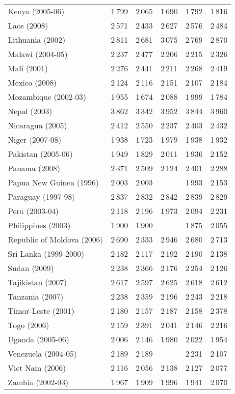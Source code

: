 \begin{tabular}{L{2.0cm} R{0.7cm} R{0.7cm} R{0.7cm} R{0.7cm} R{0.7cm}}
        Kenya (2005-06) & 1\,799 & 2\,065 & 1\,690 & 1\,792 & 1\,816 \\
        Laos (2008) & 2\,571 & 2\,433 & 2\,627 & 2\,576 & 2\,484 \\
        Lithuania (2002) & 2\,811 & 2\,681 & 3\,075 & 2\,769 & 2\,870 \\
        Malawi (2004-05) & 2\,237 & 2\,477 & 2\,206 & 2\,215 & 2\,326 \\
        Mali (2001) & 2\,276 & 2\,441 & 2\,211 & 2\,268 & 2\,419 \\
        Mexico (2008) & 2\,124 & 2\,116 & 2\,151 & 2\,107 & 2\,184 \\
        Mozambique (2002-03) & 1\,955 & 1\,674 & 2\,088 & 1\,999 & 1\,784 \\
        Nepal (2003) & 3\,862 & 3\,342 & 3\,952 & 3\,844 & 3\,960 \\
        Nicaragua (2005) & 2\,412 & 2\,550 & 2\,237 & 2\,403 & 2\,432 \\
        Niger (2007-08) & 1\,938 & 1\,723 & 1\,979 & 1\,938 & 1\,932 \\
        Pakistan (2005-06) & 1\,949 & 1\,829 & 2\,011 & 1\,936 & 2\,152 \\
        Panama (2008) & 2\,371 & 2\,509 & 2\,124 & 2\,401 & 2\,288 \\
        Papua New Guinea (1996) & 2\,003 & 2\,003 &  & 1\,993 & 2\,153 \\
        Paraguay (1997-98) & 2\,837 & 2\,832 & 2\,842 & 2\,839 & 2\,829 \\
        Peru (2003-04) & 2\,118 & 2\,196 & 1\,973 & 2\,094 & 2\,231 \\
        Philippines (2003) & 1\,900 & 1\,900 &  & 1\,875 & 2\,055 \\
        Republic of Moldova (2006) & 2\,690 & 2\,333 & 2\,946 & 2\,680 & 2\,713 \\
        Sri Lanka (1999-2000) & 2\,182 & 2\,117 & 2\,192 & 2\,190 & 2\,138 \\
        Sudan (2009) & 2\,238 & 2\,366 & 2\,176 & 2\,254 & 2\,126 \\
        Tajikistan (2007) & 2\,617 & 2\,597 & 2\,625 & 2\,618 & 2\,612 \\
        Tanzania (2007) & 2\,238 & 2\,359 & 2\,196 & 2\,243 & 2\,218 \\
        Timor-Leste (2001) & 2\,180 & 2\,157 & 2\,187 & 2\,158 & 2\,378 \\
        Togo (2006) & 2\,159 & 2\,391 & 2\,041 & 2\,146 & 2\,216 \\
        Uganda (2005-06) & 2\,006 & 2\,146 & 1\,980 & 2\,022 & 1\,954 \\
        Venezuela (2004-05) & 2\,189 & 2\,189 &  & 2\,231 & 2\,107 \\
        Viet Nam (2006) & 2\,116 & 2\,056 & 2\,138 & 2\,127 & 2\,077 \\
        Zambia (2002-03) & 1\,967 & 1\,909 & 1\,996 & 1\,941 & 2\,070 \\
       \toprule
      \end{tabular}
\clearpage


